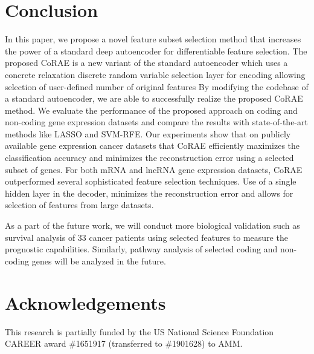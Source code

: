 \documentclass{bioinfo}
\begin{document}
\section{Conclusion}
In this paper, we propose a novel feature subset selection method that increases the power of a standard deep autoencoder for differentiable feature selection. 
The proposed CoRAE is a new variant of the standard autoencoder which uses a concrete relaxation discrete random variable selection layer for encoding allowing selection of user-defined number of original features
By modifying the codebase of a standard autoencoder, we are able to successfully realize the proposed CoRAE method.
We evaluate the performance of the proposed approach on coding and non-coding gene expression datasets and compare the results with state-of-the-art methods like LASSO and SVM-RFE.
Our experiments show that on publicly available gene expression cancer datasets that CoRAE efficiently maximizes the classification accuracy and minimizes the reconstruction error using a selected subset of genes.
For both mRNA and lncRNA gene expression datasets, CoRAE outperformed several sophisticated feature selection techniques.
Use of a single hidden layer in the decoder, minimizes the reconstruction error and allows for selection of features from large datasets.

As a part of the future work, we will conduct more biological validation such as survival analysis of 33 cancer patients using selected features to measure the prognostic capabilities.
Similarly, pathway analysis of selected coding and non-coding genes will be analyzed in the future.

\section*{Acknowledgements}


This research is partially funded by the US National Science Foundation CAREER award \#1651917 (transferred to \#1901628) to AMM.


%
%
%
%

\end{document}
